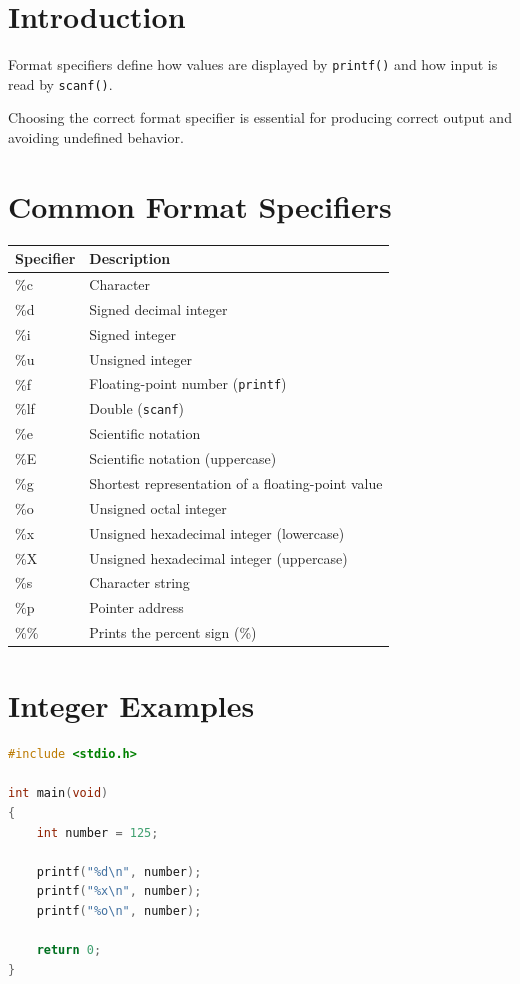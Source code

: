 \documentclass[12pt,openany]{book}
\begin{document}
\section{Introduction}

Format specifiers define how values are displayed by \texttt{printf()} and how input is read by \texttt{scanf()}.

Choosing the correct format specifier is essential for producing correct output and avoiding undefined behavior.

\section{Common Format Specifiers}

\begin{center}
\begin{tabular}{|l|p{8.5cm}|}
\hline
Specifier & Description \\
\hline
\%c & Character \\
\%d & Signed decimal integer \\
\%i & Signed integer \\
\%u & Unsigned integer \\
\%f & Floating-point number (\texttt{printf}) \\
\%lf & Double (\texttt{scanf}) \\
\%e & Scientific notation \\
\%E & Scientific notation (uppercase) \\
\%g & Shortest representation of a floating-point value \\
\%o & Unsigned octal integer \\
\%x & Unsigned hexadecimal integer (lowercase) \\
\%X & Unsigned hexadecimal integer (uppercase) \\
\%s & Character string \\
\%p & Pointer address \\
\%\% & Prints the percent sign (\%) \\
\hline
\end{tabular}
\end{center}

\section{Integer Examples}

\begin{lstlisting}[language=C]
#include <stdio.h>

int main(void)
{
    int number = 125;

    printf("%d\n", number);
    printf("%x\n", number);
    printf("%o\n", number);

    return 0;
}
\end{lstlisting}
\end{document}
